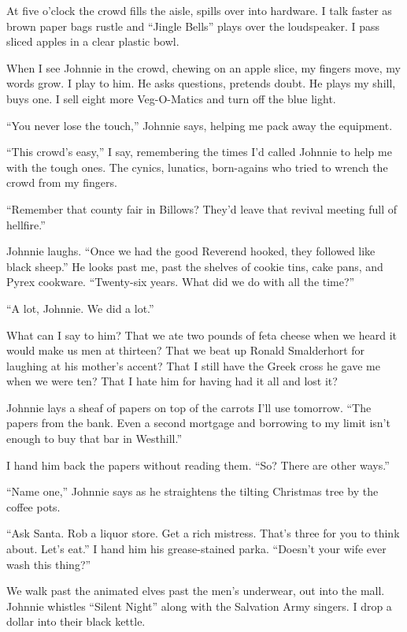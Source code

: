 \documentclass[twoside,10pt]{book}
\begin{document}
At five o'clock the crowd fills the aisle, spills over into hardware. I
talk faster as brown paper bags rustle and ``Jingle Bells'' plays over
the loudspeaker. I pass sliced apples in a clear plastic bowl.

When I see Johnnie in the crowd, chewing on an apple slice, my fingers
move, my words grow. I play to him. He asks questions, pretends doubt.
He plays my shill, buys one. I sell eight more Veg-O-Matics and turn off
the blue light.

``You never lose the touch,'' Johnnie says, helping me pack away the
equipment.

``This crowd's easy,'' I say, remembering the times I'd called Johnnie
to help me with the tough ones. The cynics, lunatics, born-agains who
tried to wrench the crowd from my fingers.

``Remember that county fair in Billows? They'd leave that revival
meeting full of hellfire.''

Johnnie laughs. ``Once we had the good Reverend hooked, they followed
like black sheep.'' He looks past me, past the shelves of cookie tins,
cake pans, and Pyrex cookware. ``Twenty-six years. What did we do with
all the time?''

``A lot, Johnnie. We did a lot.''

What can I say to him? That we ate two pounds of feta cheese when we
heard it would make us men at thirteen? That we beat up Ronald
Smalderhort for laughing at his mother's accent? That I still have the
Greek cross he gave me when we were ten? That I hate him for having had
it all and lost it?

Johnnie lays a sheaf of papers on top of the carrots I'll use tomorrow.
``The papers from the bank. Even a second mortgage and borrowing to my
limit isn't enough to buy that bar in Westhill.''

I hand him back the papers without reading them. ``So? There are other
ways.''

``Name one,'' Johnnie says as he straightens the tilting Christmas tree
by the coffee pots.

``Ask Santa. Rob a liquor store. Get a rich mistress. That's three for
you to think about. Let's eat.'' I hand him his grease-stained parka.
``Doesn't your wife ever wash this thing?''

We walk past the animated elves past the men's underwear, out into the
mall. Johnnie whistles ``Silent Night'' along with the Salvation Army
singers. I drop a dollar into their black kettle.
\end{document}
